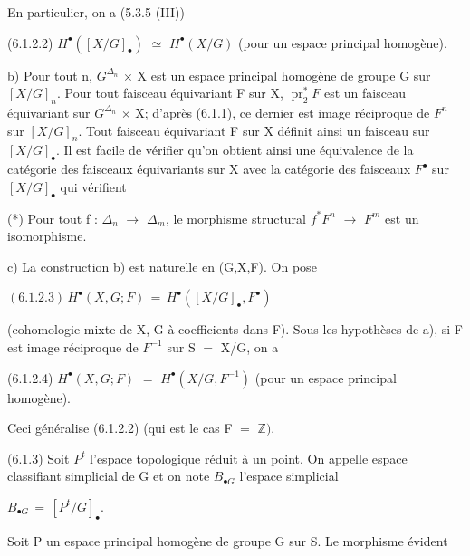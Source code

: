 \documentclass[11pt,twoside]{article}
\newcommand{\DFormula}[1]{%
  \par\smallskip\noindent\hspace*{0pt}\(\displaystyle #1\)\par\smallskip
}
\begin{document}
En particulier, on a (5.3.5 (III))\par
\par\medskip
(6.1.2.2) \(H^{\bullet }([X/G]_{\bullet })\) \(\simeq \) \(H^{\bullet }(X/G)\)   (pour un espace principal homogène).\par
\par\medskip
b) Pour tout n, \(G^{\Delta _{n}}\) \(\times \) X est un espace principal homogène de groupe G sur \([X/G]_{n}\). Pour tout faisceau équivariant F sur X, \(\operatorname{pr}_{2}^{\ast }F\) est un faisceau équivariant sur \(G^{\Delta _{n}}\) \(\times \) X; d’après (6.1.1), ce dernier est image réciproque de \(F^{n}\) sur \([X/G]_{n}\). Tout faisceau équivariant F sur X définit ainsi un faisceau sur \([X/G]_{\bullet }\). Il est facile de vérifier qu’on obtient ainsi une équivalence de la catégorie des faisceaux équivariants sur X avec la catégorie des faisceaux \(F^{\bullet }\) sur \([X/G]_{\bullet }\) qui vérifient\par
\par\medskip
(*) Pour tout f : \(\Delta _{n}\) \(\to \) \(\Delta _{m}\), le morphisme structural \(f^{\ast }F^{n}\) \(\to \) \(F^{m}\) est un isomorphisme.\par
\par\medskip
c) La construction b) est naturelle en (G,X,F). On pose\par
\par\medskip
\DFormula{(6.1.2.3)\,H^{\bullet }(X,G;F)\,=\,H^{\bullet }([X/G]_{\bullet },F^{\bullet })}
\par\medskip
(cohomologie mixte de X, G à coefficients dans F). Sous les hypothèses de a), si F est image réciproque de \(F^{−1}\) sur S \(=\) X/G, on a\par
\par\medskip
(6.1.2.4) \(H^{\bullet }(X,G;F)\) \(=\) \(H^{\bullet }(X/G,F^{−1})\)   (pour un espace principal homogène).\par
\par\medskip
Ceci généralise (6.1.2.2) (qui est le cas F \(=\) \(\mathbb{Z})\).\par
\par\medskip
(6.1.3) Soit \(P^{t}\) l’espace topologique réduit à un point. On appelle espace classifiant simplicial de G et on note \(B_{\bullet G}\) l’espace simplicial\par
\par\medskip
\DFormula{B_{\bullet G}\,=\,[P^{t}/G]_{\bullet }.}
\par\medskip
Soit P un espace principal homogène de groupe G sur S. Le morphisme évident\par
\end{document}
